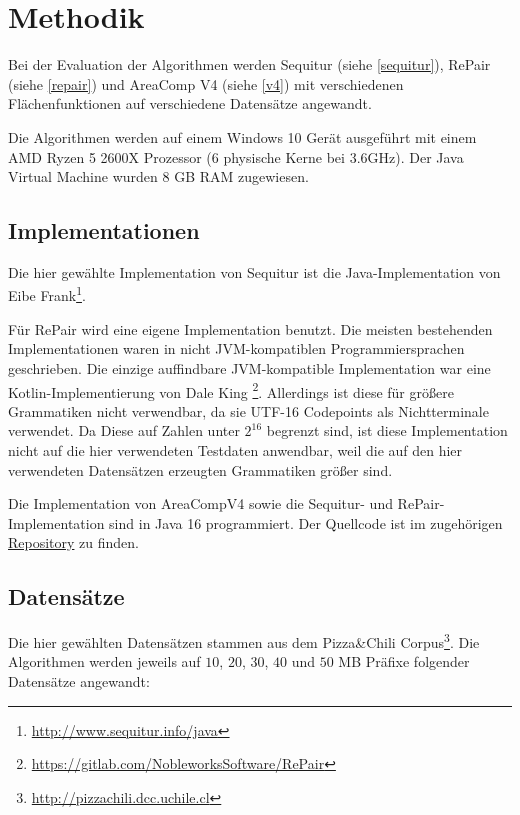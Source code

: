 \section{Methodik}

Bei der Evaluation der Algorithmen werden Sequitur (siehe \autoref{sequitur}), RePair (siehe \autoref{repair}) und AreaComp V4 (siehe \autoref{v4}) mit verschiedenen Flächenfunktionen auf verschiedene Datensätze angewandt.

Die Algorithmen werden auf einem Windows 10 Gerät ausgeführt mit einem AMD Ryzen 5 2600X Prozessor (6 physische Kerne bei 3.6GHz). Der Java Virtual Machine wurden 8 GB RAM zugewiesen.

\subsection{Implementationen}

Die hier gewählte Implementation von Sequitur ist die Java-Implementation von Eibe Frank\footnote{\url{http://www.sequitur.info/java}}. 

Für RePair wird eine eigene Implementation benutzt. Die meisten bestehenden Implementationen waren in nicht JVM-kompatiblen Programmiersprachen geschrieben. 
Die einzige auffindbare JVM-kompatible Implementation war eine Kotlin-Implementierung von Dale King \footnote{\url{https://gitlab.com/NobleworksSoftware/RePair}}. Allerdings ist diese für größere Grammatiken nicht verwendbar, da sie UTF-16 Codepoints als Nichtterminale verwendet. Da Diese auf Zahlen unter $2^{16}$ begrenzt sind, ist diese Implementation nicht auf die hier verwendeten Testdaten anwendbar, weil die auf den hier verwendeten Datensätzen erzeugten Grammatiken größer sind.

Die Implementation von AreaCompV4 sowie die Sequitur- und RePair-Implementation sind in Java 16 programmiert. Der Quellcode ist im zugehörigen \href{https://github.com/Skadic/BACompression/tree/master/compression}{Repository} zu finden.

\subsection{Datensätze}
\label{datasets}

Die hier gewählten Datensätzen stammen aus dem Pizza\&Chili Corpus\footnote{\url{http://pizzachili.dcc.uchile.cl}}. Die Algorithmen werden jeweils auf $10$, $20$, $30$, $40$ und $50$ MB Präfixe folgender Datensätze angewandt:

